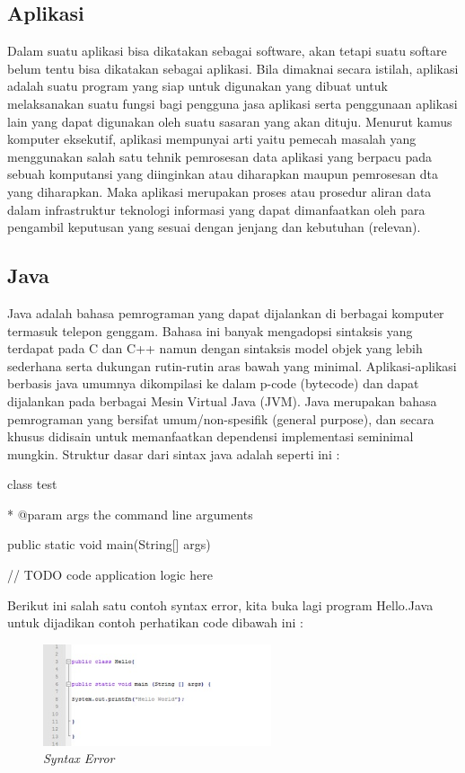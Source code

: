 \documentclass{jtetiproposalskripsi}
\begin{document}
\subsection{Aplikasi}
Dalam suatu aplikasi bisa dikatakan sebagai software, akan tetapi suatu softare belum tentu bisa dikatakan sebagai aplikasi. Bila dimaknai secara istilah, aplikasi adalah suatu program yang siap untuk digunakan yang dibuat untuk melaksanakan suatu fungsi bagi pengguna jasa aplikasi serta penggunaan aplikasi lain yang dapat digunakan oleh suatu sasaran yang akan dituju. Menurut kamus komputer eksekutif, aplikasi mempunyai arti yaitu pemecah masalah yang menggunakan salah satu tehnik pemrosesan data aplikasi yang berpacu pada sebuah komputansi yang diinginkan atau diharapkan maupun pemrosesan dta yang diharapkan. Maka aplikasi merupakan proses atau prosedur aliran data dalam infrastruktur teknologi informasi yang dapat dimanfaatkan oleh para pengambil keputusan yang sesuai dengan jenjang dan kebutuhan (relevan).

\subsection{Java}
Java adalah bahasa pemrograman yang dapat dijalankan di berbagai komputer termasuk telepon genggam.  Bahasa ini banyak mengadopsi sintaksis yang terdapat pada C dan C++ namun dengan sintaksis model objek yang lebih sederhana serta dukungan rutin-rutin aras bawah yang minimal.  Aplikasi-aplikasi berbasis java umumnya dikompilasi ke dalam p-code (bytecode) dan dapat dijalankan pada berbagai Mesin Virtual Java (JVM). Java merupakan bahasa pemrograman yang bersifat umum/non-spesifik (general purpose), dan secara khusus didisain untuk memanfaatkan dependensi implementasi seminimal mungkin. Struktur dasar dari sintax java adalah seperti ini :

class test{

* @param args the command line arguments

public static void main(String[] args) {

// TODO code application logic here
}}

Berikut ini salah satu contoh syntax error, kita buka lagi program Hello.Java untuk dijadikan contoh perhatikan code dibawah ini :
\begin{figure}[ht!]
\centering
\includegraphics[width=0.6\textwidth]{gambar/koding}
\caption{\textit{Syntax Error}}
\label{wsn}
\end{figure}
\newpage
\end{document}
